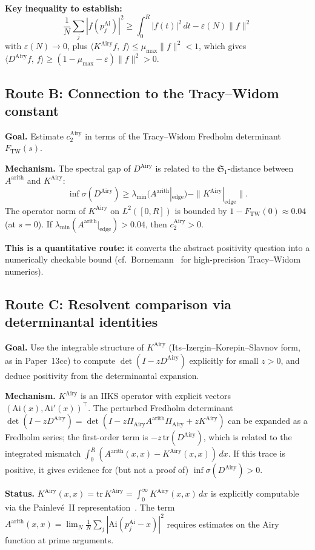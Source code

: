 \documentclass[12pt,a4paper]{amsart}
\theoremstyle{definition}
\newcommand{\Ai}{\mathrm{Ai}}
\newcommand{\KAi}{K^{\mathrm{Airy}}}
\newcommand{\DAi}{D^{\mathrm{Airy}}}
\newcommand{\PAi}{\Pi_{\mathrm{Airy}}}
\newcommand{\ip}[2]{\langle #1,\,#2\rangle}
\newcommand{\norm}[1]{\|#1\|}
\begin{document}
\textbf{Key inequality to establish:}
\[
  \frac{1}{N}\sum_j |f(p_j^{\mathrm{Ai}})|^2
  \ge \int_0^R |f(t)|^2\,dt - \varepsilon(N)\norm{f}^2
\]
with $\varepsilon(N) \to 0$, plus
$\ip{\KAi f}{f} \le \mu_{\max}\norm{f}^2 < 1$,
which gives $\ip{\DAi f}{f} \ge (1 - \mu_{\max} - \varepsilon)\norm{f}^2 > 0$.

\subsection{Route B: Connection to the Tracy--Widom constant}

\textbf{Goal.}
Estimate $c_2^{\mathrm{Airy}}$ in terms of the
Tracy--Widom Fredholm determinant $F_{\mathrm{TW}}(s)$.

\textbf{Mechanism.}
The spectral gap of $\DAi$ is related to the
$\mathfrak{S}_1$-distance between $A^{\mathrm{arith}}$
and $\KAi$:
\[
  \inf\sigma(\DAi)
  \ge \lambda_{\min}(A^{\mathrm{arith}}|_{\mathrm{edge}})
    - \|\KAi|_{\mathrm{edge}}\|.
\]
The operator norm of $\KAi$ on $L^2([0,R])$ is bounded
by $1 - F_{\mathrm{TW}}(0) \approx 0.04$ (at $s=0$).
If $\lambda_{\min}(A^{\mathrm{arith}}|_{\mathrm{edge}}) > 0.04$,
then $c_2^{\mathrm{Airy}} > 0$.

\textbf{This is a quantitative route:}
it converts the abstract positivity question
into a numerically checkable bound
(cf.\ Bornemann~\cite{Bornemann2010} for high-precision
Tracy--Widom numerics).

\subsection{Route C: Resolvent comparison via determinantal identities}

\textbf{Goal.}
Use the integrable structure of $\KAi$
(Its--Izergin--Korepin--Slavnov form,
as in Paper~13cc) to compute
$\det(I - z\DAi)$ explicitly for small $z > 0$,
and deduce positivity from the determinantal expansion.

\textbf{Mechanism.}
$\KAi$ is an IIKS operator with explicit vectors
$(\Ai(x), \Ai'(x))^\top$.
The perturbed Fredholm determinant
$\det(I - z\DAi) = \det(I - z\PAi A^{\mathrm{arith}}\PAi
+ z\KAi)$
can be expanded as a Fredholm series;
the first-order term is
$-z\,\mathrm{tr}(\DAi)$,
which is related to the integrated mismatch
$\int_0^R (A^{\mathrm{arith}}(x,x) - \KAi(x,x))\,dx$.
If this trace is positive, it gives evidence for
(but not a proof of) $\inf\sigma(\DAi) > 0$.

\textbf{Status.}
$\KAi(x,x) = \mathrm{tr}\,\KAi = \int_0^\infty K^{\mathrm{Airy}}(x,x)\,dx$
is explicitly computable via the Painlevé~II representation~\cite{TracyWidom1994}.
The term $A^{\mathrm{arith}}(x,x) = \lim_{N}\frac{1}{N}\sum_j |\Ai(p_j^{\mathrm{Ai}} - x)|^2$
requires estimates on the Airy function at prime arguments.
\end{document}
